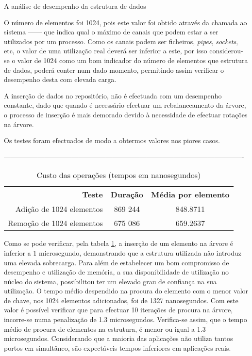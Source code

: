 A análise de desempenho da estrutura de dados

O número de elementos foi 1024, pois este valor foi obtido através da chamada ao sistema ------ que indica qual o máximo de canais que podem estar a ser utilizados por um processo.
Como os canais podem ser ficheiros, \textit{pipes}, \textit{sockets}, etc, o valor de uma utilização real deverá ser inferior a este, por isso considerou-se o valor de 1024 como um bom indicador do número de elementos que estrutura de dados, poderá conter num dado momento, permitindo assim verificar o desempenho desta com elevada carga.

A inserção de dados no repositório, não é efectuada com um desempenho constante, dado que quando é necessário efectuar um rebalanceamento da árvore, o processo de inserção é mais demorado devido à necessidade de efectuar rotações na árvore.

Os testes foram efectuados de modo a obtermos valores nos piores casos.

----------------------------------------------------------------------------------------------------------
 
\begin{table}[!htb]
\begin{center}
\caption{Custo das operações (tempos em nanosegundos)}
\begin{tabular}{ | r | c | c | }
\hline
\hspace{1cm} Teste \hspace{1.5cm} & \hspace{1cm}Duração\hspace{1cm} &  Média por
elemento \\
\hline
Adição de 1024 elementos & 869 244 & 848.8711 \\
\hline
Remoção de 1024 elementos & 675 086 & 659.2637\\
\hline

\hline
\end{tabular}
\label{tab:tree_info}
\end{center}
\end{table}

Como se pode verificar, pela tabela \ref{tab:tree_info}, a inserção de um elemento na árvore é inferior a 1 microsegundo, demonstrando que a estrutura utilizada não introduz uma elevada sobrecarga.
Para além de estabelecer um bom compromisso de desempenho e utilização de memória, a sua disponibilidade de utilização no núcleo do sistema, possibilitou ter um elevado grau de confiança na sua utilização.
O tempo médio despendido na procura do elemento com o menor valor de chave, nos 1024 elementos adicionados, foi de 1327 nanosegundos.
Com este valor é possível verificar que para efectuar 10 iterações de procura na árvore, incorre-se numa penalização de 1.3 microsegundos.
Verifica-se assim, que o tempo médio de procura de elementos na estrutura, é menor ou igual a 1.3 microsegundos.
Considerando que a maioria das aplicações não utiliza tantos portos em simultâneo, são expectáveis tempos inferiores em aplicações reais.


